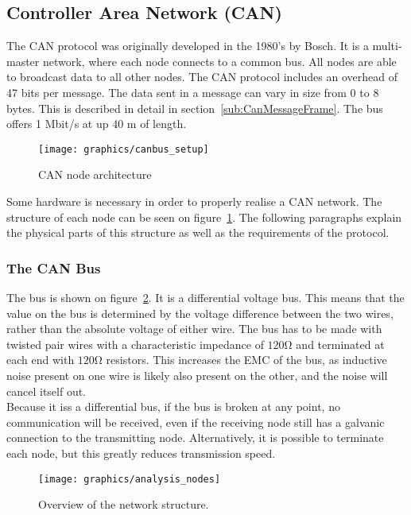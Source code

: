 
\subsection{Controller Area Network (CAN)}\label{sec:canbusanalysis}
The CAN protocol was originally developed in the 1980's by Bosch.
It is a multi-master network, where each node connects to a common bus.
All nodes are able to broadcast data to all other nodes.
The CAN protocol includes an overhead of 47 bits per message.
The data sent in a message can vary in size from 0 to 8 bytes.
This is described in detail in section~\ref{sub:CanMessageFrame}.
The bus offers 1 Mbit/s at up 40 \si{\metre} of length.

\begin{figure}[h!]
	\centering
	\texttt{[image: graphics/canbus\_setup]}
	\caption{CAN node architecture}
	\label{fig:canbus_setup}
\end{figure}

Some hardware is necessary in order to properly realise a CAN network.
The structure of each node can be seen on figure~\ref{fig:canbus_setup}.
The following paragraphs explain the physical parts of this structure as well as the requirements of the protocol.

\subsubsection*{The CAN Bus}
The bus is shown on figure~\ref{fig:analysisnodes}.
It is a differential voltage bus.
This means that the value on the bus is determined by the voltage difference between the two wires, rather than the absolute voltage of either wire.
The bus has to be made with twisted pair wires with a characteristic impedance of $\si{120 \ohm}$ and terminated at each end with $\si{120 \ohm}$ resistors.
This increases the EMC of the bus, as inductive noise present on one wire is likely also present on the other, and the noise will cancel itself out.\\

Because it iss a differential bus, if the bus is broken at any point, no communication will be received, even if the receiving node still has a galvanic connection to the transmitting node.
Alternatively, it is possible to terminate each node, but this greatly reduces transmission speed.

\begin{figure}[h]
	\centering
	\texttt{[image: graphics/analysis\_nodes]}
	\caption{Overview of the network structure.}
	\label{fig:analysisnodes}
\end{figure}

